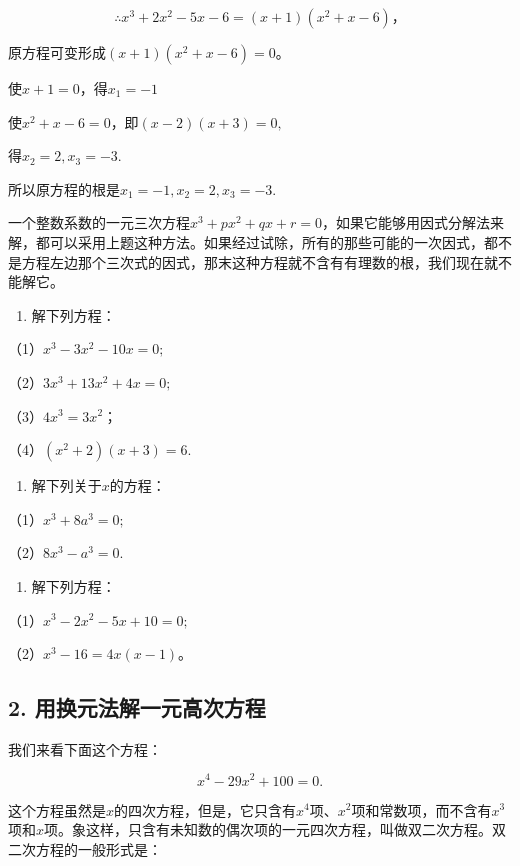 \[
\therefore x ^ {3} + 2 x ^ {2} - 5 x - 6 = (x + 1) (x ^ {2} + x - 6)\text{，}
\]

原方程可变形成\((x + 1)(x^2 + x - 6) = 0\)。

使\(x + 1 = 0\)，得\(x_{1} = -1\)

使\(x^{2} + x - 6 = 0\)，即\((x - 2)(x + 3) = 0,\)

得\(x_{2} = 2, x_{3} = -3.\)

所以原方程的根是\(x_{1} = -1, x_{2} = 2, x_{3} = -3.\)

一个整数系数的一元三次方程\(x^{3} + px^{2} + qx + r = 0\)，如果它能够用因式分解法来解，都可以采用上题这种方法。如果经过试除，所有的那些可能的一次因式，都不是方程左边那个三次式的因式，那末这种方程就不含有有理数的根，我们现在就不能解它。

\begin{enumerate}
\item
  解下列方程：
\end{enumerate}

（1）\(x^{3} - 3x^{2} - 10x = 0;\)

（2）\(3x^{3} + 13x^{2} + 4x = 0;\)

（3）\(4x^{3} = 3x^{2}\)；

（4）\((x^{2} + 2)(x + 3) = 6.\)

\begin{enumerate}[start=2]
\item
  解下列关于\(x\)的方程：
\end{enumerate}

（1）\(x^{3} + 8a^{3} = 0;\)

（2）\(8x^{3} - a^{3} = 0.\)

\begin{enumerate}[start=3]
\item
  解下列方程：
\end{enumerate}

（1）\(x^{3} - 2x^{2} - 5x + 10 = 0;\)

（2）\(x^{3} - 16 = 4x(x - 1)\)。

\subsection{2. 用换元法解一元高次方程}

我们来看下面这个方程：

\[
x ^ {4} - 29 x ^ {2} + 100 = 0.
\]

这个方程虽然是\(x\)的四次方程，但是，它只含有\(x^4\)项、\(x^2\)项和常数项，而不含有\(x^3\)项和\(x\)项。象这样，只含有未知数的偶次项的一元四次方程，叫做双二次方程。双二次方程的一般形式是：


